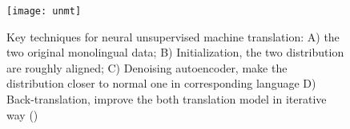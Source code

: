 \begin{figure}[H]
	\texttt{[image: unmt]}
	\caption{Key techniques for neural unsupervised machine translation: A) the two original monolingual data; B) Initialization, the two distribution are roughly aligned; C) Denoising autoencoder, make the distribution closer to normal one in corresponding language D) Back-translation, improve the both translation model in iterative way (\cite{lample2018phrase})}
	
\end{figure}









